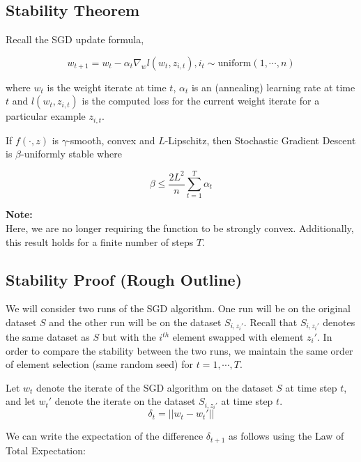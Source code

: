 \documentclass{article}
\begin{document}
\subsection*{Stability Theorem}
Recall the SGD update formula,

\begin{equation}
    w_{t+1} = w_t - \alpha_t \nabla_w l(w_t, z_{i,t}), i_t   \sim \text{uniform}(1, \cdots, n )
\end{equation}

where $w_t$ is the weight iterate at time $t$, $\alpha_t$ is an (annealing) learning rate at time $t$ and $l(w_t, z_{i,t})$ is the computed loss for the current weight iterate for a particular example $z_{i,t}$.
 

\begin{thm}
If $f(\cdot, z)$ is $\gamma$-smooth, convex and $L$-Lipschitz, then Stochastic Gradient Descent is $\beta$-uniformly stable where

\[
\beta \leq \frac{2L^2}{n} \sum_{t=1}^{T} \alpha_t
\]
\end{thm}

\textbf{Note:} \\
Here, we are no longer requiring the function to be strongly convex.  Additionally, this result holds for a finite number of steps $T$.  

\subsection*{Stability Proof (Rough Outline)}
We will consider two runs of the SGD algorithm.  One run will be on the original dataset $S$ and the other run will be on the dataset $S_{i,z_i'}$.  Recall that $S_{i,z_i'}$ denotes the same dataset as $S$ but with the $i^{th}$ element swapped with element $z_i'$.  In order to compare the stability between the two runs, we maintain the same order of element selection (same random seed) for $t=1, \cdots, T$. 

\vspace{0.2cm}

\begin{defn} \label{def:delta}
Let $w_t$ denote the iterate of the SGD algorithm on the dataset $S$ at time step $t$, and let $w_t'$ denote the iterate on the dataset $S_{i,z_i'}$ at time step $t$.
    \[
    \delta_t = || w_t - w_t'||
    \]
\end{defn}

We can write the expectation of the difference $\delta_{t+1}$ as follows using the Law of Total Expectation:
\end{document}
